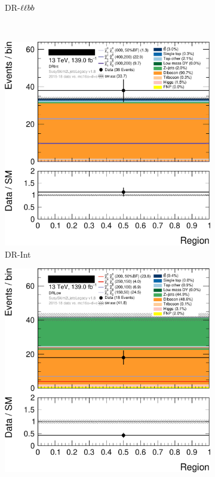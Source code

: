\begin{figure}[tp]
\begin{subfigure}{0.46\textwidth}
\caption{DR-$\ell\ell bb$}
\end{subfigure}
\\[0.5em]
\begin{subfigure}{0.46\textwidth}
\centering
\includegraphics[width=\textwidth]{figures/2ljets_disco_plot_DRInt.png}
\caption{DR-Int}
\end{subfigure}
\hfill
\begin{subfigure}{0.46\textwidth}
\centering
\includegraphics[width=\textwidth]{figures/2ljets_disco_plot_DRLow.png}

\end{subfigure}
\end{figure}
